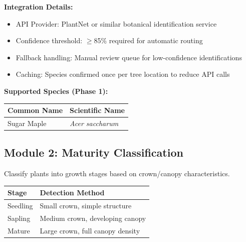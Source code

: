 \documentclass[11pt,a4paper]{article}
\begin{document}
\begin{center}
\end{center}

\textbf{Integration Details:}
\begin{itemize}[leftmargin=*]
\item API Provider: PlantNet or similar botanical identification service
\item Confidence threshold: $\geq$85\% required for automatic routing
\item Fallback handling: Manual review queue for low-confidence identifications
\item Caching: Species confirmed once per tree location to reduce API calls
\end{itemize}

\textbf{Supported Species (Phase 1):}
\begin{center}
\begin{tabular}{ll}
\toprule
\textbf{Common Name} & \textbf{Scientific Name} \\
\midrule
Sugar Maple & \textit{Acer saccharum} \\
\bottomrule
\end{tabular}
\end{center}

\subsection{Module 2: Maturity Classification}

Classify plants into growth stages based on crown/canopy characteristics.

\begin{center}
\begin{tabular}{ll}
\toprule
\textbf{Stage} & \textbf{Detection Method} \\
\midrule
Seedling & Small crown, simple structure \\
Sapling & Medium crown, developing canopy \\
Mature & Large crown, full canopy density \\
\bottomrule
\end{tabular}
\end{center}
\end{document}
